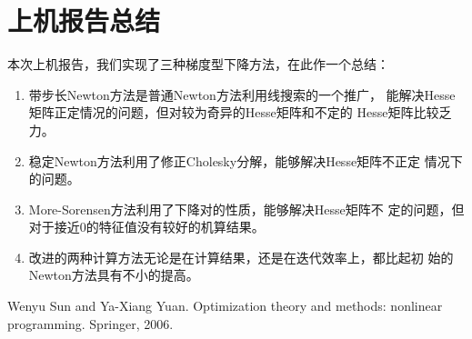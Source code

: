 \documentclass[a4paper,  11pt]{ctexart}
\begin{document}
\section{上机报告总结}
本次上机报告，我们实现了三种梯度型下降方法，在此作一个总结：
\begin{enumerate}
  \item 带步长Newton方法是普通Newton方法利用线搜索的一个推广，
    能解决Hesse矩阵正定情况的问题，但对较为奇异的Hesse矩阵和不定的
    Hesse矩阵比较乏力。
  \item 稳定Newton方法利用了修正Cholesky分解，能够解决Hesse矩阵不正定
    情况下的问题。
  \item More-Sorensen方法利用了下降对的性质，能够解决Hesse矩阵不
    定的问题，但对于接近0的特征值没有较好的机算结果。
  \item 改进的两种计算方法无论是在计算结果，还是在迭代效率上，都比起初
    始的Newton方法具有不小的提高。
\end{enumerate}
\renewcommand\refname{参考文献}
\begin{thebibliography}{99}
Wenyu Sun and Ya-Xiang Yuan.
  Optimization theory and methods: nonlinear
  programming. Springer, 2006.
\end{thebibliography}
\end{document}
